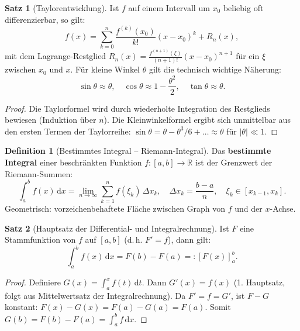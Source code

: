 ﻿\documentclass[a4paper,12pt]{report}
\theoremstyle{definition}
\newtheorem{definition}{Definition}
\newtheorem{satz}{Satz}
\begin{document}
\begin{satz}[Taylorentwicklung]
Ist $f$ auf einem Intervall um $x_0$ beliebig oft differenzierbar, so gilt:
\[
  f(x) = \sum_{k=0}^{n} \frac{f^{(k)}(x_0)}{k!}(x-x_0)^k + R_n(x),
\]
mit dem Lagrange-Restglied $R_n(x) = \frac{f^{(n+1)}(\xi)}{(n+1)!}(x-x_0)^{n+1}$
f\"ur ein $\xi$ zwischen $x_0$ und $x$.
F\"ur kleine Winkel $\theta$ gilt die technisch wichtige N\"aherung:
\[
  \sin\theta \approx \theta, \quad \cos\theta \approx 1 - \frac{\theta^2}{2}, \quad \tan\theta \approx \theta.
\]
\end{satz}
\begin{proof}
Die Taylorformel wird durch wiederholte Integration des Restglieds bewiesen
(Induktion \"uber $n$). Die Kleinwinkelformel ergibt sich unmittelbar
aus den ersten Termen der Taylorreihe:
$\sin\theta = \theta - \theta^3/6 + \ldots \approx \theta$ f\"ur $|\theta| \ll 1$.
\end{proof}

\begin{definition}[Bestimmtes Integral -- Riemann-Integral]
Das \textbf{bestimmte Integral} einer beschr\"ankten Funktion $f: [a,b] \to \mathbb{R}$
ist der Grenzwert der Riemann-Summen:
\[
  \int_a^b f(x)\,\mathrm{d}x
  = \lim_{n\to\infty} \sum_{k=1}^n f(\xi_k)\,\Delta x_k,
  \quad \Delta x_k = \frac{b-a}{n},\quad \xi_k \in [x_{k-1}, x_k].
\]
Geometrisch: vorzeichenbehaftete Fl\"ache zwischen Graph von $f$ und der $x$-Achse.
\end{definition}

\begin{satz}[Hauptsatz der Differential- und Integralrechnung]
Ist $F$ eine Stammfunktion von $f$ auf $[a,b]$ (d.\,h. $F' = f$), dann gilt:
\[
  \int_a^b f(x)\,\mathrm{d}x = F(b) - F(a) =: [F(x)]_a^b.
\]
\end{satz}
\begin{proof}
Definiere $G(x) = \int_a^x f(t)\,\mathrm{d}t$.
Dann $G'(x) = f(x)$ (1. Hauptsatz, folgt aus Mittelwertsatz der Integralrechnung).
Da $F' = f = G'$, ist $F - G$ konstant: $F(x) - G(x) = F(a) - G(a) = F(a)$.
Somit $G(b) = F(b) - F(a) = \int_a^b f\,\mathrm{d}x$.
\end{proof}
\end{document}
